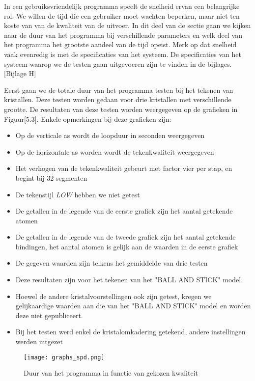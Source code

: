 In een gebruiksvriendelijk programma speelt de snelheid ervan een belangrijke rol. We willen de tijd die een gebruiker moet wachten beperken, maar niet ten koste van van de kwaliteit van de uitvoer. In dit deel van de sectie gaan we kijken naar de duur van het programma bij verschillende parameters en welk deel van het programma het grootste aandeel van de tijd opeist. Merk op dat snelheid vaak evenredig is met de specificaties van het systeem. De specificaties van het systeem waarop we de testen gaan uitgevoeren zijn te vinden in de bijlages.[Bijlage H]  
\par
Eerst gaan we de totale duur van het programma testen bij het tekenen van kristallen. Deze testen worden gedaan voor drie kristallen met verschillende grootte. De resultaten van deze testen worden weergegeven op de grafieken in Figuur[5.3]. Enkele opmerkingen bij deze grafieken zijn:
\begin{itemize}
\item Op de verticale as wordt de loopduur in seconden weergegeven
\item Op de horizontale as worden wordt de tekenkwaliteit weergegeven
\item Het verhogen van de tekenkwaliteit gebeurt met factor vier per stap, en begint bij 32 segmenten
\item De tekenstijl \textit{LOW} hebben we niet getest
\item De getallen in de legende van de eerste grafiek zijn het aantal getekende atomen
\item De getallen in de legende van de tweede grafiek zijn het aantal getekende bindingen, het aantal atomen is gelijk aan de waarden in de eerste grafiek 
\item De gegeven waarden zijn telkens het gemiddelde van drie testen 
\item Deze resultaten zijn voor het tekenen van het "BALL AND STICK" model.
\item Hoewel de andere kristalvoorstellingen ook zijn getest, kregen we gelijkaardige waarden aan die van het "BALL AND STICK" model en worden deze niet gepubliceert.
\item Bij het testen werd enkel de kristalomkadering getekend, andere instellingen werden uitgezet 

\end{itemize}

\begin{figure}[H]
\begin{center}
\texttt{[image: graphs\_spd.png]}
\caption{Duur van het programma in functie van gekozen kwaliteit}
\end{center}
\end{figure}

